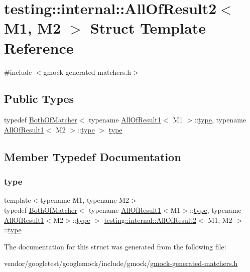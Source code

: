 \hypertarget{structtesting_1_1internal_1_1_all_of_result2}{}\section{testing\+:\+:internal\+:\+:All\+Of\+Result2$<$ M1, M2 $>$ Struct Template Reference}
\label{structtesting_1_1internal_1_1_all_of_result2}


{\ttfamily \#include $<$gmock-\/generated-\/matchers.\+h$>$}

\subsection*{Public Types}
\begin{DoxyCompactItemize}
\item 
typedef \hyperlink{classtesting_1_1internal_1_1_both_of_matcher}{Both\+Of\+Matcher}$<$ typename \hyperlink{structtesting_1_1internal_1_1_all_of_result1}{All\+Of\+Result1}$<$ M1 $>$\+::\hyperlink{structtesting_1_1internal_1_1_all_of_result2_adec0b0ce2fdd07d398e1fdd2cdb88392}{type}, typename \hyperlink{structtesting_1_1internal_1_1_all_of_result1}{All\+Of\+Result1}$<$ M2 $>$\+::\hyperlink{structtesting_1_1internal_1_1_all_of_result2_adec0b0ce2fdd07d398e1fdd2cdb88392}{type} $>$ \hyperlink{structtesting_1_1internal_1_1_all_of_result2_adec0b0ce2fdd07d398e1fdd2cdb88392}{type}
\end{DoxyCompactItemize}


\subsection{Member Typedef Documentation}
\mbox{\label{structtesting_1_1internal_1_1_all_of_result2_adec0b0ce2fdd07d398e1fdd2cdb88392}} 
\subsubsection{\texorpdfstring{type}{type}}
{\footnotesize\ttfamily template$<$typename M1, typename M2$>$ \\
typedef \hyperlink{classtesting_1_1internal_1_1_both_of_matcher}{Both\+Of\+Matcher}$<$ typename \hyperlink{structtesting_1_1internal_1_1_all_of_result1}{All\+Of\+Result1}$<$M1$>$\+::\hyperlink{structtesting_1_1internal_1_1_all_of_result2_adec0b0ce2fdd07d398e1fdd2cdb88392}{type}, typename \hyperlink{structtesting_1_1internal_1_1_all_of_result1}{All\+Of\+Result1}$<$M2$>$\+::\hyperlink{structtesting_1_1internal_1_1_all_of_result2_adec0b0ce2fdd07d398e1fdd2cdb88392}{type} $>$ \hyperlink{structtesting_1_1internal_1_1_all_of_result2}{testing\+::internal\+::\+All\+Of\+Result2}$<$ M1, M2 $>$\+::\hyperlink{structtesting_1_1internal_1_1_all_of_result2_adec0b0ce2fdd07d398e1fdd2cdb88392}{type}}



The documentation for this struct was generated from the following file\+:\begin{DoxyCompactItemize}
\item 
vendor/googletest/googlemock/include/gmock/\hyperlink{gmock-generated-matchers_8h}{gmock-\/generated-\/matchers.\+h}\end{DoxyCompactItemize}
